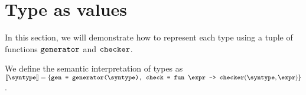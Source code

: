 \section{Type as values}

In this section, we will demonstrate how to represent each type using a tuple of functions $\texttt{generator}$ and $\texttt{checker}$.

\begin{definition}
  \label{def_typeAsVal}
  We define the semantic interpretation of types as $\llbracket \syntype \rrbracket = \{\texttt{gen = \mkgen{\syntype}, check = }\mkfunv{\expr}{\mkche{\syntype}{\expr}}\}$.
\end{definition}



